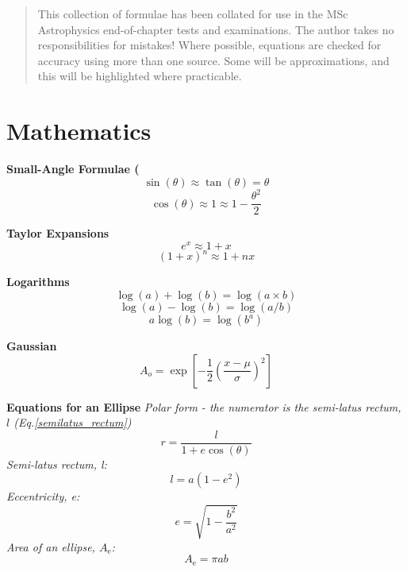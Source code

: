 \documentclass{spy}
\begin{document}
\begin{abstract}
This collection of formulae has been collated for use in the MSc Astrophysics end-of-chapter tests and examinations. The author takes no responsibilities for mistakes! Where possible, equations are checked for accuracy using more than one source. Some will be approximations, and this will be highlighted where practicable. 
\end{abstract}

\tableofcontents

\newpage

\section{Mathematics}

\textbf{Small-Angle Formulae (}
\begin{equation}
\sin(\theta) \approx \tan(\theta) = \theta
\end{equation}
\begin{equation}
\cos(\theta) \approx 1 \approx 1 - \frac {\theta^2} {2}
\end{equation}

\textbf{Taylor Expansions}
\begin{equation}
e^x \approx 1 + x
\end{equation}
\begin{equation}
\left(1 + x\right)^n \approx 1 + nx
\end{equation}

\textbf{Logarithms}
\begin{equation}
\log(a) + \log(b) = \log(a \times b)
\end{equation}
\begin{equation}
\log(a) - \log(b) = \log(a/b)
\end{equation}
\begin{equation}
a \log(b) = \log(b^a)
\end{equation}

\textbf {Gaussian}
\begin{equation}
A_o = \exp \left[ - \frac {1}{2} \left( \frac {x - \mu}{\sigma} \right)^2 \right]
\end{equation}

\textbf {Equations for an Ellipse}
\vspace{5mm}
\textit {Polar form - the numerator is the semi-latus rectum, \(l\) (Eq.\ref{semilatus_rectum})}
\begin{equation}
r = \frac {l} {1 + e \cos\left(\theta\right)}
\end{equation}
\textit {Semi-latus rectum, l:}
\begin{equation} \label{semilatus_rectum}
l = a \left(1-e^2\right) 
\end{equation}
\textit {Eccentricity, e:}
\begin{equation}
e = \sqrt {1 - \frac {b^2} {a^2}} 
\end{equation}
\textit {Area of an ellipse, \(A_\mathrm{e}\):}
\begin{equation}
A_\mathrm{e} = \pi a b 
\end{equation}
\end{document}
